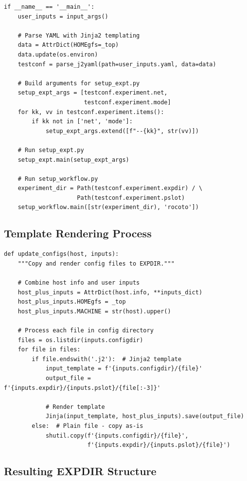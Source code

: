 \documentclass[11pt,letterpaper]{article}
\begin{document}
\begin{lstlisting}[style=pythonstyle, title=create\_experiment.py (Simplified)]
if __name__ == '__main__':
    user_inputs = input_args()
    
    # Parse YAML with Jinja2 templating
    data = AttrDict(HOMEgfs=_top)
    data.update(os.environ)
    testconf = parse_j2yaml(path=user_inputs.yaml, data=data)
    
    # Build arguments for setup_expt.py
    setup_expt_args = [testconf.experiment.net, 
                       testconf.experiment.mode]
    for kk, vv in testconf.experiment.items():
        if kk not in ['net', 'mode']:
            setup_expt_args.extend([f"--{kk}", str(vv)])
    
    # Run setup_expt.py
    setup_expt.main(setup_expt_args)
    
    # Run setup_workflow.py
    experiment_dir = Path(testconf.experiment.expdir) / \
                     Path(testconf.experiment.pslot)
    setup_workflow.main([str(experiment_dir), 'rocoto'])
\end{lstlisting}

\subsection{Template Rendering Process}

\begin{lstlisting}[style=pythonstyle, title=update\_configs() Function]
def update_configs(host, inputs):
    """Copy and render config files to EXPDIR."""
    
    # Combine host info and user inputs
    host_plus_inputs = AttrDict(host.info, **inputs_dict)
    host_plus_inputs.HOMEgfs = _top
    host_plus_inputs.MACHINE = str(host).upper()
    
    # Process each file in config directory
    files = os.listdir(inputs.configdir)
    for file in files:
        if file.endswith('.j2'):  # Jinja2 template
            input_template = f'{inputs.configdir}/{file}'
            output_file = f'{inputs.expdir}/{inputs.pslot}/{file[:-3]}'
            
            # Render template
            Jinja(input_template, host_plus_inputs).save(output_file)
        else:  # Plain file - copy as-is
            shutil.copy(f'{inputs.configdir}/{file}',
                        f'{inputs.expdir}/{inputs.pslot}/{file}')
\end{lstlisting}

\subsection{Resulting EXPDIR Structure}
\end{document}
